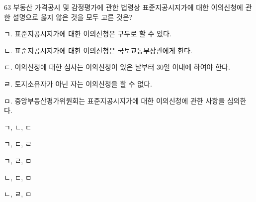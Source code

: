 \begin{question}{63}
부동산 가격공시 및 감정평가에 관한 법령상 표준지공시지가에 대한 이의신청에 관한 설명으로 옳지 않은 것을 모두 고른 것은?
\begin{framedtext}
ㄱ. 표준지공시지가에 대한 이의신청은 구두로 할 수 있다. \par
ㄴ. 표준지공시지가에 대한 이의신청은 국토교통부장관에게 한다. \par
ㄷ. 이의신청에 대한 심사는 이의신청이 있은 날부터 30일 이내에 하여야 한다. \par
ㄹ. 토지소유자가 아닌 자는 이의신청을 할 수 없다. \par
ㅁ. 중앙부동산평가위원회는 표준지공시지가에 대한 이의신청에 관한 사항을 심의한다.
\end{framedtext}
\begin{choices}
  \item ㄱ, ㄴ, ㄷ
  \item ㄱ, ㄷ, ㄹ
  \item ㄱ, ㄹ, ㅁ
  \item ㄴ, ㄷ, ㅁ
  \item ㄴ, ㄹ, ㅁ
\end{choices}
\end{question}
